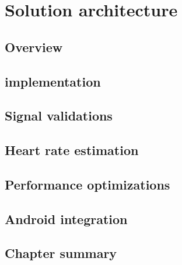\chapter{Solution architecture} \label{chap:solution}

\section*{}




\section{Overview} \label{sec:solution:overview}


\section{\evm{} implementation} \label{sec:solution:evm}


\section{Signal validations} \label{sec:solution:validations}

\section{Heart rate estimation} \label{sec:solution:estimation}

\section{Performance optimizations} \label{sec:solution:performance}

\section{Android integration} \label{sec:solution:android}


\section{Chapter summary}

